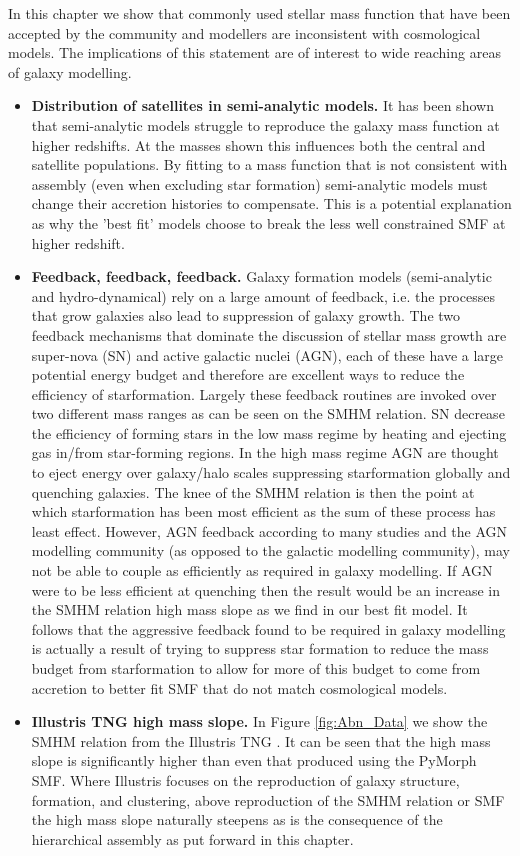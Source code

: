 In this chapter we show that commonly used stellar mass function that have been accepted by the community and modellers are inconsistent with \LCDM cosmological models. The implications of this statement are of interest to wide reaching areas of galaxy modelling. 
\begin{itemize}
    \item \textbf{Distribution of satellites in semi-analytic models.} It has been shown \citep[e.g.][]{Asquith2018CosmicModels} that semi-analytic models struggle to reproduce the galaxy mass function at higher redshifts. At the masses shown this influences both the central and satellite populations. By fitting to a mass function that is not consistent with \LCDM assembly (even when excluding star formation) semi-analytic models must change their accretion histories to compensate. This is a potential explanation as why the 'best fit' models choose to break the less well constrained SMF at higher redshift.
    \item \textbf{Feedback, feedback, feedback.} Galaxy formation models (semi-analytic and hydro-dynamical) rely on a large amount of feedback, i.e. the processes that grow galaxies also lead to suppression of galaxy growth. The two feedback mechanisms that dominate the discussion of stellar mass growth are super-nova (SN) and active galactic nuclei (AGN), each of these have a large potential energy budget and therefore are excellent ways to reduce the efficiency of starformation. Largely these feedback routines are invoked over two different mass ranges as can be seen on the SMHM relation. SN decrease the efficiency of forming stars in the low mass regime by heating and ejecting gas in/from star-forming regions. In the high mass regime AGN are thought to eject energy over galaxy/halo scales suppressing starformation globally and quenching galaxies. The knee of the SMHM relation is then the point at which starformation has been most efficient as the sum of these process has least effect. However, AGN feedback according to many studies and the AGN modelling community (as opposed to the galactic modelling community), may not be able to couple as efficiently as required in galaxy modelling. If AGN were to be less efficient at quenching then the result would be an increase in the SMHM relation high mass slope as we find in our best fit model. It follows that the aggressive feedback found to be required in galaxy modelling is actually a result of trying to suppress star formation to reduce the mass budget from starformation to allow for more of this budget to come from accretion to better fit SMF that do not match cosmological models.
    \item \textbf{Illustris TNG high mass slope.} In Figure \ref{fig:Abn_Data} we show the SMHM relation from the Illustris TNG \citep{Nelson2018TheRelease}. It can be seen that the high mass slope is significantly higher than even that produced using the PyMorph SMF. Where Illustris focuses on the reproduction of galaxy structure, formation, and clustering, above reproduction of the SMHM relation or SMF the high mass slope naturally steepens as is the consequence of the hierarchical assembly as put forward in this chapter.
\end{itemize}


